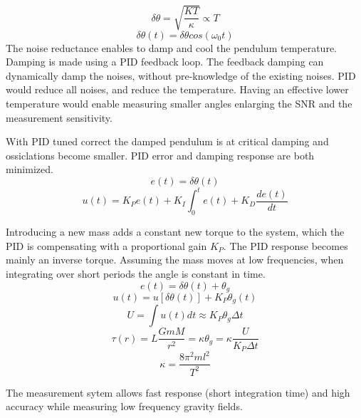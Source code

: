 \documentclass[\main/master.tex]{subfiles}
\begin{document}
\begin{equation}
\delta\theta = \sqrt{\frac{KT}{\kappa}}\propto{T}  \label{eqn:radiation force}
\end{equation}
\begin{equation}
\delta\theta(t) = \delta\theta cos(\omega_0 t)   \label{eqn:pid_error}
\end{equation}
The noise reductance enables to damp and cool the pendulum temperature. Damping is made using a PID feedback loop. The feedback damping can dynamically damp the noises, without pre-knowledge of the existing noises. PID would reduce all noises, and reduce the temperature. Having an effective lower temperature would enable measuring smaller angles enlarging the SNR and the measurement sensitivity.
\par\noindent
With PID tuned correct the damped pendulum is at critical damping and ossiclations become smaller. PID error and damping response are both minimized. 
\begin{equation}
e(t) = \delta\theta(t)   \label{eqn:pid_error}
\end{equation}
\begin{equation}
u(t) = K_Pe(t)+K_I\int_{0}^{t}e(t)+K_D\frac{de(t)}{dt}   \label{eqn:PID_eq}
\end{equation}

\noindent
Introducing a new mass adds a constant new torque to the system, which the PID is compensating with a proportional gain $K_P$. The PID response becomes mainly an inverse torque. Assuming the mass moves at low frequencies, when integrating over short periods the angle is constant in time.
\begin{equation}
e(t) = \delta\theta(t) + \theta_g    \label{eqn:PID_measurement}
\end{equation}
\begin{equation}
u(t) = u[ \delta\theta(t)] + K_P\theta_g(t) \label{eqn:PID_measurement_eq}
\end{equation}
\begin{equation}
U = \int u(t)dt  \approx K_P\theta_g\Delta t \label{eqn:PID_measurement_eq}
\end{equation}
\begin{equation}
\tau(r) = L\frac{GmM}{r^2} =  \kappa\theta_g = \kappa\frac{U}{K_P\Delta t}      \label{eqn:pid_gravitation_torque}
\end{equation}
\begin{equation}
\kappa =\frac{8\pi^2ml^2}{T^2}    \label{eqn:empirical_torque}
\end{equation}

\noindent
The measurement sytem allows fast response (short integration time) and high accuracy while measuring low frequency gravity fields. 

 
 
 
 
\end{document}
